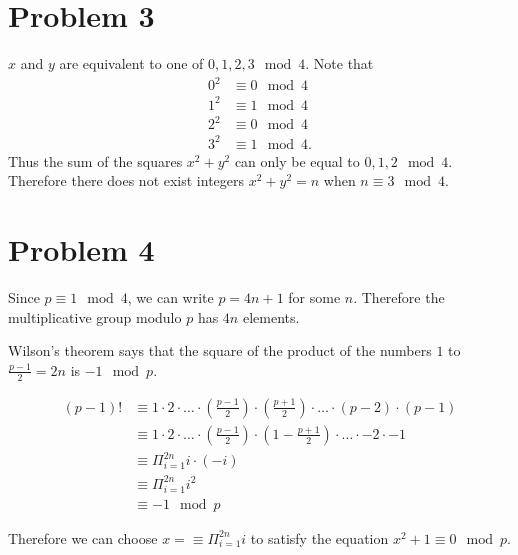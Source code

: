 \documentclass{article}
\begin{document}
\newpage
\section*{Problem 3}
$x$ and $y$ are equivalent to 
one of $0,1,2,3 \mod 4$.
Note that 
\begin{align*}
	0^2 &\equiv 0 \mod 4 \\
	1^2 &\equiv 1 \mod 4 \\
	2^2 &\equiv 0 \mod 4 \\
	3^2 &\equiv 1 \mod 4.
\end{align*}
Thus the sum of the squares $x^2+y^2$
can only be equal to $0,1,2 \mod 4$.
Therefore there does not exist integers 
$x^2+y^2 = n$ when $n \equiv 3 \mod 4$.

\newpage 
\section*{Problem 4}
Since $p \equiv 1 \mod 4$, we can write $p = 4n+1$ for some $n$.
Therefore the multiplicative group modulo $p$ has $4n$ elements.


Wilson's theorem says that the square of the  product of the numbers $1$ to $\frac{p-1}{2} = 2n$
is $-1 \mod p$.

\begin{align*}
	(p-1)! &\equiv 1 \cdot 2 \cdot \ldots \cdot \left(\frac{p-1}{2}\right)\cdot\left(\frac{p+1}{2}\right)\cdot \ldots \cdot (p-2)\cdot (p-1)\\
	&\equiv  1 \cdot 2 \cdot \ldots \cdot \left(\frac{p-1}{2}\right)\cdot\left(1 - \frac{p+1}{2}\right)\cdot \ldots \cdot -2 \cdot -1 \\
	&\equiv \Pi_{i=1}^{2n} i\cdot(-i) \\
	&\equiv \Pi_{i=1}^{2n} i^2 \\
	&\equiv -1 \mod p
\end{align*}

Therefore we can choose $x = \equiv \Pi_{i=1}^{2n} i$ to 
satisfy the equation $x^2 + 1 \equiv 0 \mod p$.
\end{document}
